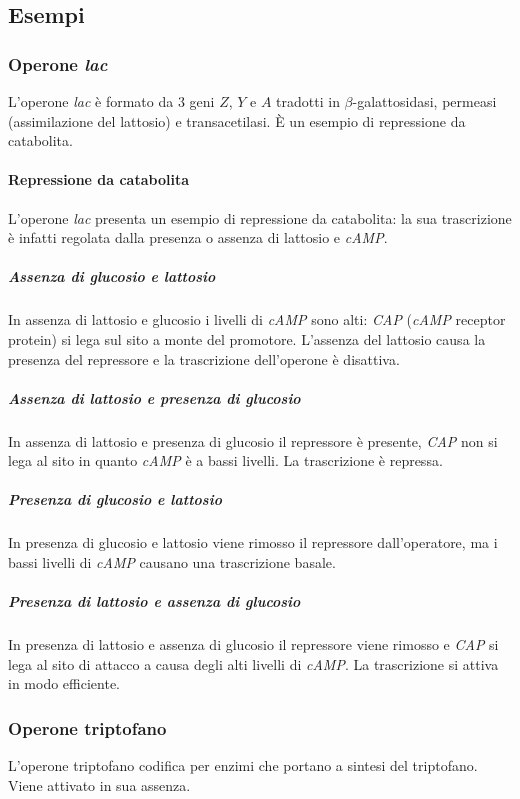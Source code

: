 	\subsection{Esempi}

		\subsubsection{Operone \emph{lac}}
		L'operone \emph{lac} \`e formato da $3$ geni $Z$, $Y$ e $A$ tradotti in $\beta$-galattosidasi, permeasi (assimilazione del lattosio) e transacetilasi.
		\`E un esempio di repressione da catabolita.

			\paragraph{Repressione da catabolita}
			L'operone \emph{lac} presenta un esempio di repressione da catabolita: la sua trascrizione \`e infatti regolata dalla presenza o assenza di lattosio e \emph{cAMP}.

				\subparagraph{Assenza di glucosio e lattosio}
				In assenza di lattosio e glucosio i livelli di \emph{cAMP} sono alti: \emph{CAP} (\emph{cAMP} receptor protein) si lega sul sito a monte del promotore.
				L'assenza del lattosio causa la presenza del repressore e la trascrizione dell'operone \`e disattiva.

				\subparagraph{Assenza di lattosio e presenza di glucosio}
				In assenza di lattosio e presenza di glucosio il repressore \`e presente, \emph{CAP} non si lega al sito in quanto \emph{cAMP} \`e a bassi livelli.
				La trascrizione \`e repressa.

				\subparagraph{Presenza di glucosio e lattosio}
				In presenza di glucosio e lattosio viene rimosso il repressore dall'operatore, ma i bassi livelli di \emph{cAMP} causano una trascrizione basale.

				\subparagraph{Presenza di lattosio e assenza di glucosio}
				In presenza di lattosio e assenza di glucosio il repressore viene rimosso e \emph{CAP} si lega al sito di attacco a causa degli alti livelli di \emph{cAMP}.
				La trascrizione si attiva in modo efficiente.

		\subsubsection{Operone triptofano}
		L'operone triptofano codifica per enzimi che portano a sintesi del triptofano.
		Viene attivato in sua assenza.

